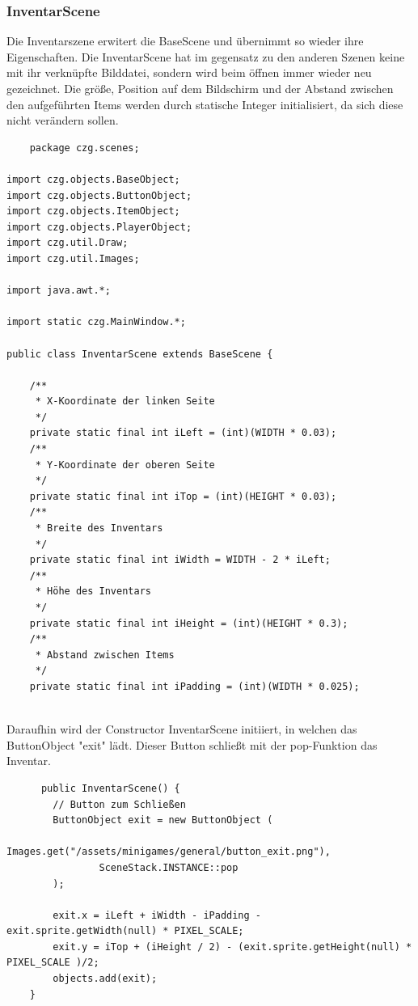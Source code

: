\subsubsection{InventarScene}
Die Inventarszene erwitert die BaseScene und übernimmt so wieder ihre Eigenschaften. Die InventarScene hat im gegensatz zu den anderen Szenen keine mit ihr verknüpfte Bilddatei, sondern wird beim öffnen immer wieder neu gezeichnet. Die größe, Position auf dem Bildschirm und der Abstand zwischen den aufgeführten Items werden durch statische Integer initialisiert, da sich diese nicht verändern sollen.\\

\begin{lstlisting}
    package czg.scenes;

import czg.objects.BaseObject;
import czg.objects.ButtonObject;
import czg.objects.ItemObject;
import czg.objects.PlayerObject;
import czg.util.Draw;
import czg.util.Images;

import java.awt.*;

import static czg.MainWindow.*;

public class InventarScene extends BaseScene {

    /**
     * X-Koordinate der linken Seite
     */
    private static final int iLeft = (int)(WIDTH * 0.03);
    /**
     * Y-Koordinate der oberen Seite
     */
    private static final int iTop = (int)(HEIGHT * 0.03);
    /**
     * Breite des Inventars
     */
    private static final int iWidth = WIDTH - 2 * iLeft;
    /**
     * Höhe des Inventars
     */
    private static final int iHeight = (int)(HEIGHT * 0.3);
    /**
     * Abstand zwischen Items
     */
    private static final int iPadding = (int)(WIDTH * 0.025);


\end{lstlisting}
Daraufhin wird der Constructor InventarScene initiiert, in welchen das ButtonObject "exit" lädt. Dieser Button schließt mit der pop-Funktion das Inventar.
\\
\begin{lstlisting}
      public InventarScene() {
        // Button zum Schließen
        ButtonObject exit = new ButtonObject (
                Images.get("/assets/minigames/general/button_exit.png"),
                SceneStack.INSTANCE::pop
        );

        exit.x = iLeft + iWidth - iPadding - exit.sprite.getWidth(null) * PIXEL_SCALE;
        exit.y = iTop + (iHeight / 2) - (exit.sprite.getHeight(null) * PIXEL_SCALE )/2;
        objects.add(exit);
    }
\end{lstlisting}

